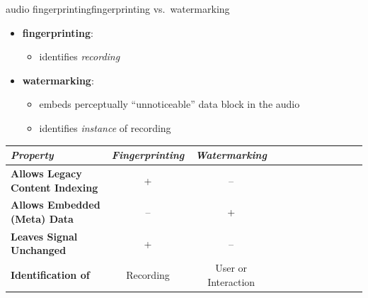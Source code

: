         \begin{frame}{audio fingerprinting}{fingerprinting vs.\ watermarking}
            \begin{itemize}
                \item	\textbf{fingerprinting}:
                    \begin{itemize}
                        \item identifies \textit{recording}
                    \end{itemize}
                \item	\textbf{watermarking}:
                    \begin{itemize}
                        \item embeds perceptually ``unnoticeable'' data block in the audio
                        \item   identifies \textit{instance} of recording
                    \end{itemize}
            \end{itemize}
            \pause
            \begin{footnotesize}
                \begin{table}
                    \centering
                    \begin{tabular}{lccccccccccc} %
                        \\ \hline
                        \bf{\emph{Property}}	 & \bf{\emph{Fingerprinting}}	 & \bf{\emph{Watermarking}}\\ 
                         \hline
                        \bf{Allows Legacy Content Indexing}	 & +	 & --\\
                        \bf{Allows Embedded (Meta) Data}	 & --	 & +\\
                        \bf{Leaves Signal Unchanged}	 & +	 & --\\
                        \bf{Identification of}	 & Recording	 & User or Interaction\\
                    \end{tabular}
                \end{table}
            \end{footnotesize}
        \end{frame}

